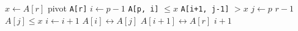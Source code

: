 \begin{codebox}
\li $x \gets A[r]$ 
	\Comment pivot \texttt{A[r]}
\li $i \gets p - 1$
\zi \Comment \texttt{A[p, i]} $\leq x$
\zi \Comment \texttt{A[i+1, j-1]} $> x$
\li \For $j \gets p$ \To $r-1$
\li \Do
		\If $A[j] \leq x$
\li 	\Then
			$i \gets i + 1$
\li 		$A[i] \leftrightarrow A[j]$
		\End
	\End
\li $A[i+1] \leftrightarrow A[r]$
\li \Return $i + 1$
\end{codebox}